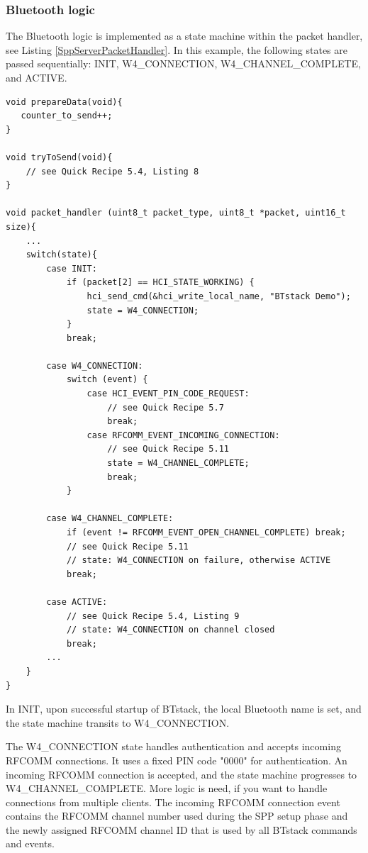 \documentclass[a4paper,titlepage,oneside,12pt]{amsart} %
\begin{document}
\subsubsection{Bluetooth logic}
The Bluetooth logic is implemented as a state machine within the packet handler, see Listing \ref{SppServerPacketHandler}. In this example, the following states are passed sequentially: INIT, W4\_CONNECTION, W4\_CHANNEL\_COMPLETE, and ACTIVE.

\begin{lstlisting}[float, caption=SPP Server - Heartbeat Counter over RFCOMM., label=SppServerPacketHandler]
void prepareData(void){
   counter_to_send++;
}

void tryToSend(void){
    // see Quick Recipe 5.4, Listing 8
}

void packet_handler (uint8_t packet_type, uint8_t *packet, uint16_t size){
    ...    
    switch(state){
        case INIT:
            if (packet[2] == HCI_STATE_WORKING) {
                hci_send_cmd(&hci_write_local_name, "BTstack Demo");
                state = W4_CONNECTION;
            }
            break;

        case W4_CONNECTION:
            switch (event) {
                case HCI_EVENT_PIN_CODE_REQUEST:
                    // see Quick Recipe 5.7
                    break;
                case RFCOMM_EVENT_INCOMING_CONNECTION:
                    // see Quick Recipe 5.11
                    state = W4_CHANNEL_COMPLETE;
                    break;
            }
        
        case W4_CHANNEL_COMPLETE:
            if (event != RFCOMM_EVENT_OPEN_CHANNEL_COMPLETE) break;
            // see Quick Recipe 5.11
            // state: W4_CONNECTION on failure, otherwise ACTIVE
            break;
        
        case ACTIVE:
            // see Quick Recipe 5.4, Listing 9
            // state: W4_CONNECTION on channel closed
            break;
        ...
    }
}
\end{lstlisting}

In INIT, upon successful startup of BTstack, the local Bluetooth name is set, and the state machine transits to W4\_CONNECTION.

The W4\_CONNECTION state handles authentication and accepts incoming RFCOMM connections. It uses a fixed PIN code "0000" for authentication. An incoming RFCOMM  connection is accepted, and the state machine progresses to W4\_CHANNEL\_COMPLETE.  More logic is need, if you want to handle connections from multiple clients. The incoming RFCOMM connection event contains the RFCOMM channel number used during the SPP setup phase and the newly assigned RFCOMM channel ID that is used by all BTstack commands and events. 
\end{document}
